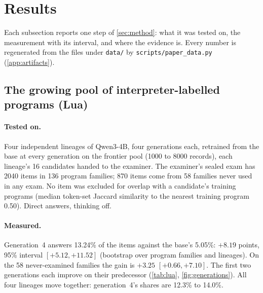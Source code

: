 \section{Results}\label{sec:results}

Each subsection reports one step of \cref{sec:method}: what it was tested on, the measurement with its interval, and where the
evidence is. Every number is regenerated from the files under \texttt{data/} by \texttt{scripts/paper\_data.py}
(\cref{app:artifacts}).

\subsection{The growing pool of interpreter-labelled programs (Lua)}\label{sec:r-pool}

\paragraph{Tested on.} Four independent lineages of Qwen3-4B, four generations each, retrained from the base at every
generation on the frontier pool (1000 to 8000 records), each lineage's 16 candidates handed to the examiner. The examiner's
sealed exam has 2040 items in 136 program families; 870 items come from 58 families never used in any exam. No item was
excluded for overlap with a candidate's training programs (median token-set Jaccard similarity to the nearest training program
0.50). Direct answers, thinking off.

\paragraph{Measured.} Generation~4 answers 13.24\% of the items against the base's 5.05\%: $+8.19$ points, 95\% interval
$[+5.12, +11.52]$ (bootstrap over program families and lineages). On the 58 never-examined families the gain is $+3.25$
$[+0.66, +7.10]$. The first two generations each improve on their predecessor (\cref{tab:lua}, \cref{fig:generations}). All
four lineages move together: generation~4's shares are 12.3\% to 14.0\%.

